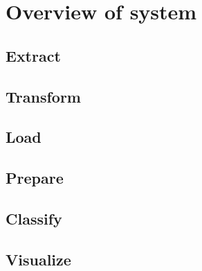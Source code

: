 \section{Overview of system}
\subsection{Extract}
\subsection{Transform}
\subsection{Load}
\subsection{Prepare}
\subsection{Classify}
\subsection{Visualize}